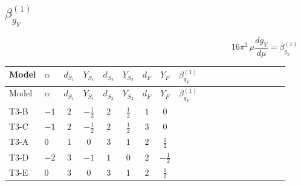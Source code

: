 \documentclass{article}
\begin{document}
\begin{landscape}
\section*{$\beta_{g_Y}^{(1)}$}
\[16\pi^2\,\mu\frac{d g_Y}{d\mu}=\beta_{g_Y}^{(1)}\]
\tiny
\begin{longtable}{@{}llcccccc >{\raggedright\arraybackslash}p{0.54\linewidth}@{}}
\toprule
Model & $\alpha$ & $d_{S_1}$ & $Y_{S_1}$ & $d_{S_2}$ & $Y_{S_2}$ & $d_F$ & $Y_F$ & $\beta_{g_Y}^{(1)}$ \\
\midrule
\endfirsthead
\toprule
Model & $\alpha$ & $d_{S_1}$ & $Y_{S_1}$ & $d_{S_2}$ & $Y_{S_2}$ & $d_F$ & $Y_F$ & $\beta_{g_Y}^{(1)}$ \\
\midrule
\endhead
T3-B & $-1$ & $2$ & $-\frac{1}{2}$ & $2$ & $\frac{1}{2}$ & $1$ & $0$ & \scriptsize\adjustbox{max width=\linewidth}{$\begin{gathered} \frac{43 {g_Y}^3}{6}\end{gathered}$} \\
\midrule
T3-C & $-1$ & $2$ & $-\frac{1}{2}$ & $2$ & $\frac{1}{2}$ & $3$ & $0$ & \scriptsize\adjustbox{max width=\linewidth}{$\begin{gathered} \frac{43 {g_Y}^3}{6}\end{gathered}$} \\
\midrule
T3-A & $0$ & $1$ & $0$ & $3$ & $1$ & $2$ & $\frac{1}{2}$ & \scriptsize\adjustbox{max width=\linewidth}{$\begin{gathered} \frac{59 {g_Y}^3}{6}\end{gathered}$} \\
\midrule
T3-D & $-2$ & $3$ & $-1$ & $1$ & $0$ & $2$ & $-\frac{1}{2}$ & \scriptsize\adjustbox{max width=\linewidth}{$\begin{gathered} \frac{59 {g_Y}^3}{6}\end{gathered}$} \\
\midrule
T3-E & $0$ & $3$ & $0$ & $3$ & $1$ & $2$ & $\frac{1}{2}$ & \scriptsize\adjustbox{max width=\linewidth}{$\begin{gathered} \frac{59 {g_Y}^3}{6}\end{gathered}$} \\
\midrule
\bottomrule
\end{longtable}
\clearpage

\end{landscape}
\end{document}
